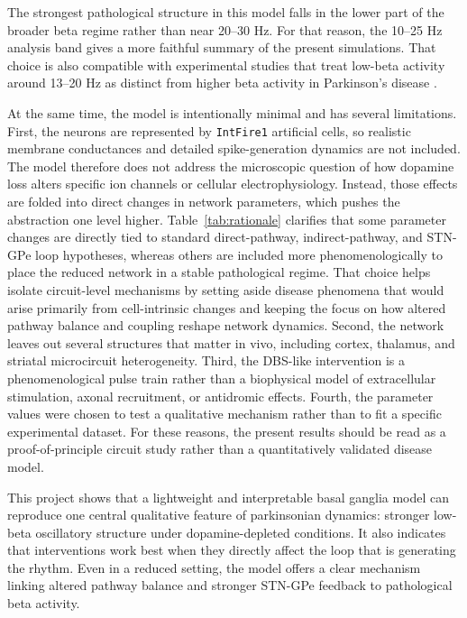 \documentclass[11pt]{article}
\begin{document}
The strongest pathological structure in this model falls in the lower part of the broader beta regime rather than near 20--30 Hz. For that reason, the 10--25 Hz analysis band gives a more faithful summary of the present simulations. That choice is also compatible with experimental studies that treat low-beta activity around 13--20 Hz as distinct from higher beta activity in Parkinson's disease \citep{JenkinsonBrown2011,Levy2002,Mathiopoulou2024}.

At the same time, the model is intentionally minimal and has several limitations. First, the neurons are represented by \texttt{IntFire1} artificial cells, so realistic membrane conductances and detailed spike-generation dynamics are not included. The model therefore does not address the microscopic question of how dopamine loss alters specific ion channels or cellular electrophysiology. Instead, those effects are folded into direct changes in network parameters, which pushes the abstraction one level higher. Table~\ref{tab:rationale} clarifies that some parameter changes are directly tied to standard direct-pathway, indirect-pathway, and STN-GPe loop hypotheses, whereas others are included more phenomenologically to place the reduced network in a stable pathological regime. That choice helps isolate circuit-level mechanisms by setting aside disease phenomena that would arise primarily from cell-intrinsic changes and keeping the focus on how altered pathway balance and coupling reshape network dynamics. Second, the network leaves out several structures that matter in vivo, including cortex, thalamus, and striatal microcircuit heterogeneity. Third, the DBS-like intervention is a phenomenological pulse train rather than a biophysical model of extracellular stimulation, axonal recruitment, or antidromic effects. Fourth, the parameter values were chosen to test a qualitative mechanism rather than to fit a specific experimental dataset. For these reasons, the present results should be read as a proof-of-principle circuit study rather than a quantitatively validated disease model.

This project shows that a lightweight and interpretable basal ganglia model can reproduce one central qualitative feature of parkinsonian dynamics: stronger low-beta oscillatory structure under dopamine-depleted conditions. It also indicates that interventions work best when they directly affect the loop that is generating the rhythm. Even in a reduced setting, the model offers a clear mechanism linking altered pathway balance and stronger STN-GPe feedback to pathological beta activity.
\end{document}
